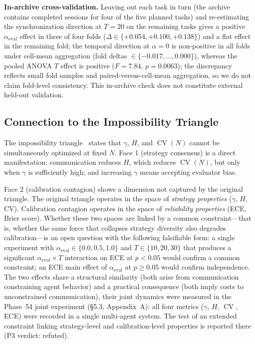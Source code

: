 \documentclass[11pt]{article}
\DeclareMathOperator{\CV}{CV}
\begin{document}
\noindent\textbf{In-archive cross-validation.} Leaving out each task in turn (the archive contains completed sessions for four of the five planned tasks) and re-estimating the synchronization direction at $T{=}20$ on the remaining tasks gives a positive $\alpha_{\text{eval}}$ effect in three of four folds ($\Delta \in \{+0.054, +0.100, +0.138\}$) and a flat effect in the remaining fold; the temporal direction at $\alpha{=}0$ is non-positive in all folds under cell-mean aggregation (fold deltas $\in \{-0.017, \ldots, 0.000\}$), whereas the pooled ANOVA $T$ effect is positive ($F=7.84$, $p=0.0063$); the discrepancy reflects small fold samples and paired-versus-cell-mean aggregation, so we do not claim fold-level consistency. This in-archive check does not constitute external held-out validation.

\subsection{Connection to the Impossibility Triangle}

The impossibility triangle~\cite{impossible2026} states that $\gamma$, $H$, and $\CV(N)$ cannot be simultaneously optimized at fixed $N$. Face 1 (strategy consensus) is a direct manifestation: communication reduces $H$, which reduces $\CV(N)$, but only when $\gamma$ is sufficiently high; and increasing $\gamma$ means accepting evaluator bias.

Face 2 (calibration contagion) shows a dimension not captured by the original triangle. The original triangle operates in the space of \textit{strategy properties} ($\gamma$, $H$, CV). Calibration contagion operates in the space of \textit{reliability properties} (ECE, Brier score). Whether these two spaces are linked by a common constraint---that is, whether the same force that collapses strategy diversity also degrades calibration---is an open question with the following falsifiable form: a single experiment with $\alpha_{\text{eval}} \in \{0.0, 0.5, 1.0\}$ and $T \in \{10, 20, 30\}$ that produces a significant $\alpha_{\text{eval}} \times T$ interaction on ECE at $p < 0.05$ would confirm a common constraint; an ECE main effect of $\alpha_{\text{eval}}$ at $p \geq 0.05$ would confirm independence. The two effects share a structural similarity (both arise from communication constraining agent behavior) and a practical consequence (both imply costs to unconstrained communication), their joint dynamics were measured in the Phase~54 joint experiment (§5.3, Appendix~A): all four metrics ($\gamma$, $H$, $\CV$, ECE) were recorded in a single multi-agent system. The test of an extended constraint linking strategy-level and calibration-level properties is reported there (P3 verdict: refuted).
\end{document}
